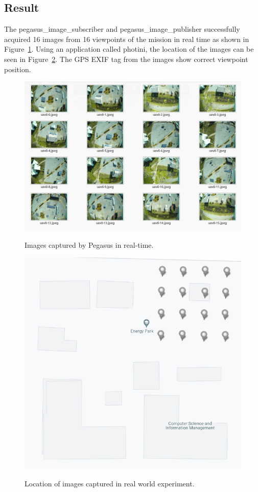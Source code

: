 \subsection{Result}

The pegasus\_image\_subscriber and pegasus\_image\_publisher successfully acquired 16 images from 16 viewpoints of the mission in real time as shown in Figure~\ref{fig:real-images}. Using an application called photini, the location of the images can be seen in Figure~\ref{fig:exif-real-images}. The GPS EXIF tag from the images show correct viewpoint position.
\begin{figure}
	\centering
	\caption[Images captured by Pegasus in real-time.]{\small Images captured by Pegasus in real-time.} 
	\includegraphics[width=6in]{figures/experiment/real-images}
	\label{fig:real-images}
\end{figure}

\begin{figure}
	\centering
	\caption[Location of images captured in real world experiment.]{\small Location of images captured in real world experiment.} 
	\includegraphics[width=5in]{figures/experiment/real-images-exif-tag}
	\label{fig:exif-real-images}
\end{figure}


